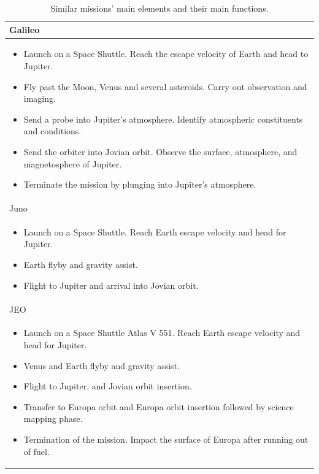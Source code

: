 \begin{longtable}{p{}}
  \caption{Similar missions' main elements and their main functions.}
  \\

  Galileo \\* \midrule

  \begin{itemize}
  \item Launch on a Space Shuttle. Reach the escape velocity of Earth
    and head to Jupiter.
  \item Fly past the Moon, Venus and several asteroids. Carry out
    observation and imaging.
  \item Send a probe into Jupiter's atmosphere. Identify atmospheric
    constituents and conditions.
  \item Send the orbiter into Jovian orbit. Observe the surface,
    atmosphere, and magnetosphere of Jupiter.
  \item Terminate the mission by plunging into Jupiter's
    atmosphere.
  \end{itemize} \\

  Juno \\* \midrule

  \begin{itemize}
  \item Launch on a Space Shuttle. Reach Earth escape velocity and
    head for Jupiter.
  \item Earth flyby and gravity assist.
  \item Flight to Jupiter and arrival into Jovian orbit.
  \end{itemize} \\ \pagebreak

  JEO \\* \midrule

  \begin{itemize}
  \item Launch on a Space Shuttle Atlas V 551. Reach Earth
   escape velocity and head for Jupiter.
  \item Venus and Earth flyby and gravity assist.
  \item Flight to Jupiter, and Jovian orbit insertion.
  \item Transfer to Europa orbit and Europa orbit insertion followed
    by science mapping phase.
  \item Termination of the mission. Impact the surface of Europa after
    running out of fuel.
  \end{itemize} \\


\end{longtable}
